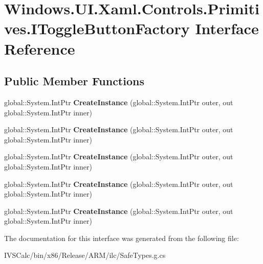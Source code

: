 \hypertarget{interface_windows_1_1_u_i_1_1_xaml_1_1_controls_1_1_primitives_1_1_i_toggle_button_factory}{}\section{Windows.\+U\+I.\+Xaml.\+Controls.\+Primitives.\+I\+Toggle\+Button\+Factory Interface Reference}
\label{interface_windows_1_1_u_i_1_1_xaml_1_1_controls_1_1_primitives_1_1_i_toggle_button_factory}
\subsection*{Public Member Functions}
\begin{DoxyCompactItemize}
\item 
\mbox{\label{interface_windows_1_1_u_i_1_1_xaml_1_1_controls_1_1_primitives_1_1_i_toggle_button_factory_afb339903bcb6e910804cc72233e8cebe}} 
global\+::\+System.\+Int\+Ptr {\bfseries Create\+Instance} (global\+::\+System.\+Int\+Ptr outer, out global\+::\+System.\+Int\+Ptr inner)
\item 
\mbox{\label{interface_windows_1_1_u_i_1_1_xaml_1_1_controls_1_1_primitives_1_1_i_toggle_button_factory_afb339903bcb6e910804cc72233e8cebe}} 
global\+::\+System.\+Int\+Ptr {\bfseries Create\+Instance} (global\+::\+System.\+Int\+Ptr outer, out global\+::\+System.\+Int\+Ptr inner)
\item 
\mbox{\label{interface_windows_1_1_u_i_1_1_xaml_1_1_controls_1_1_primitives_1_1_i_toggle_button_factory_afb339903bcb6e910804cc72233e8cebe}} 
global\+::\+System.\+Int\+Ptr {\bfseries Create\+Instance} (global\+::\+System.\+Int\+Ptr outer, out global\+::\+System.\+Int\+Ptr inner)
\item 
\mbox{\label{interface_windows_1_1_u_i_1_1_xaml_1_1_controls_1_1_primitives_1_1_i_toggle_button_factory_afb339903bcb6e910804cc72233e8cebe}} 
global\+::\+System.\+Int\+Ptr {\bfseries Create\+Instance} (global\+::\+System.\+Int\+Ptr outer, out global\+::\+System.\+Int\+Ptr inner)
\item 
\mbox{\label{interface_windows_1_1_u_i_1_1_xaml_1_1_controls_1_1_primitives_1_1_i_toggle_button_factory_afb339903bcb6e910804cc72233e8cebe}} 
global\+::\+System.\+Int\+Ptr {\bfseries Create\+Instance} (global\+::\+System.\+Int\+Ptr outer, out global\+::\+System.\+Int\+Ptr inner)
\end{DoxyCompactItemize}


The documentation for this interface was generated from the following file\+:\begin{DoxyCompactItemize}
\item 
I\+V\+S\+Calc/bin/x86/\+Release/\+A\+R\+M/ilc/Safe\+Types.\+g.\+cs\end{DoxyCompactItemize}
